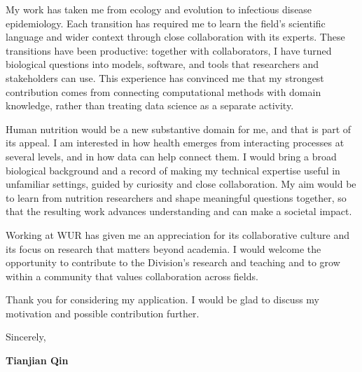 \documentclass[10pt,a4paper]{article}
\begin{document}
My work has taken me from ecology and evolution to infectious disease epidemiology. Each transition has required me to learn the field's scientific language and wider context through close collaboration with its experts. These transitions have been productive: together with collaborators, I have turned biological questions into models, software, and tools that researchers and stakeholders can use. This experience has convinced me that my strongest contribution comes from connecting computational methods with domain knowledge, rather than treating data science as a separate activity.

Human nutrition would be a new substantive domain for me, and that is part of its appeal. I am interested in how health emerges from interacting processes at several levels, and in how data can help connect them. I would bring a broad biological background and a record of making my technical expertise useful in unfamiliar settings, guided by curiosity and close collaboration. My aim would be to learn from nutrition researchers and shape meaningful questions together, so that the resulting work advances understanding and can make a societal impact.

Working at WUR has given me an appreciation for its collaborative culture and its focus on research that matters beyond academia. I would welcome the opportunity to contribute to the Division's research and teaching and to grow within a community that values collaboration across fields.

Thank you for considering my application. I would be glad to discuss my motivation and possible contribution further.

Sincerely,

\vspace{0.15em}
\textbf{\color{Navy}Tianjian Qin}
\end{document}
